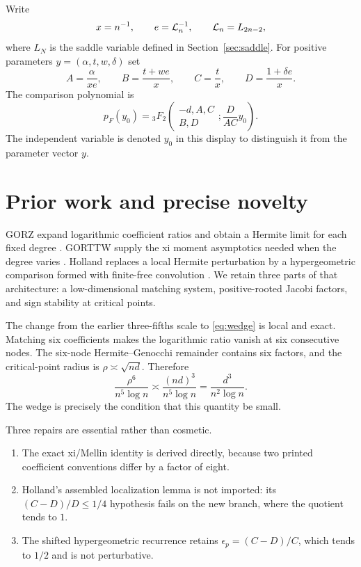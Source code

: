 \documentclass[12pt]{article}
\begin{document}
Write
\[
 x=n^{-1},\qquad e=\mathcal L_n^{-1},\qquad \mathcal L_n=L_{2n-2},
\]
where $L_N$ is the saddle variable defined in
Section~\ref{sec:saddle}.  For positive parameters
$y=(\alpha,t,w,\delta)$ set
\begin{equation}\label{eq:ABCD}
 A=\frac{\alpha}{xe},\qquad
 B=\frac{t+we}{x},\qquad
 C=\frac{t}{x},\qquad
 D=\frac{1+\delta e}{x}.
\end{equation}
The comparison polynomial is
\begin{equation}\label{eq:model-def}
 p_F(y_0)={}_3F_2\!\left(
 \begin{matrix}-d,A,C\\B,D\end{matrix};
 \frac{D}{AC}y_0\right).
\end{equation}
The independent variable is denoted $y_0$ in this display to distinguish it
from the parameter vector $y$.

\section{Prior work and precise novelty}\label{sec:prior}

GORZ expand logarithmic coefficient ratios and obtain a Hermite limit for
each fixed degree \cite{GORZ2019}.  GORTTW supply the xi moment asymptotics
needed when the degree varies \cite{GORTTW2020}.  Holland replaces a local
Hermite perturbation by a hypergeometric comparison formed with finite-free
convolution \cite{Holland2026}.  We retain three parts of that architecture:
a low-dimensional matching system, positive-rooted Jacobi factors, and sign
stability at critical points.

The change from the earlier three-fifths scale to \eqref{eq:wedge} is local
and exact.  Matching six coefficients makes the logarithmic ratio vanish at
six consecutive nodes.  The six-node Hermite--Genocchi remainder contains
six factors, and the critical-point radius is $\rho\asymp\sqrt{nd}$.
Therefore
\[
 \frac{\rho^6}{n^5\log n}
 \asymp \frac{(nd)^3}{n^5\log n}
 =\frac{d^3}{n^2\log n}.
\]
The wedge is precisely the condition that this quantity be small.

Three repairs are essential rather than cosmetic.
\begin{enumerate}
\item The exact xi/Mellin identity is derived directly, because two printed
coefficient conventions differ by a factor of eight.
\item Holland's assembled localization lemma is not imported: its
$(C-D)/D\le1/4$ hypothesis fails on the new branch, where the quotient tends
to $1$.
\item The shifted hypergeometric recurrence retains
$\epsilon_p=(C-D)/C$, which tends to $1/2$ and is not perturbative.
\end{enumerate}
\end{document}
